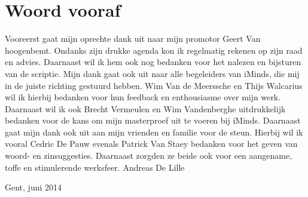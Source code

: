 \chapter{Woord vooraf}
\npar
Vooreerst gaat mijn oprechte dank uit naar mijn promotor Geert Van hoogenbemt. Ondanks zijn drukke agenda kon ik regelmatig rekenen op zijn raad en advies. Daarnaast wil ik hem ook nog bedanken voor het nalezen en bijsturen van de scriptie.
\npar
Mijn dank gaat ook uit naar alle begeleiders van iMinds, die mij in de juiste richting gestuurd hebben. Wim Van de Meerssche en Thijs Walcarius wil ik hierbij bedanken voor hun feedback en enthousiasme over mijn werk. Daarnaast wil ik ook Brecht Vermeulen en Wim Vandenberghe uitdrukkelijk bedanken voor de kans om mijn masterproef uit te voeren bij iMinds. 
\npar
Daarnaast gaat mijn dank ook uit aan mijn vrienden en familie voor de steun. Hierbij wil ik vooral Cedric De Pauw evenals Patrick Van Staey bedanken voor het geven van woord- en zinsuggesties. Daarnaast zorgden ze beide ook voor een aangename, toffe en stimulerende werksfeer.
\npar
\hfill Andreas De Lille

\hfill Gent, juni 2014